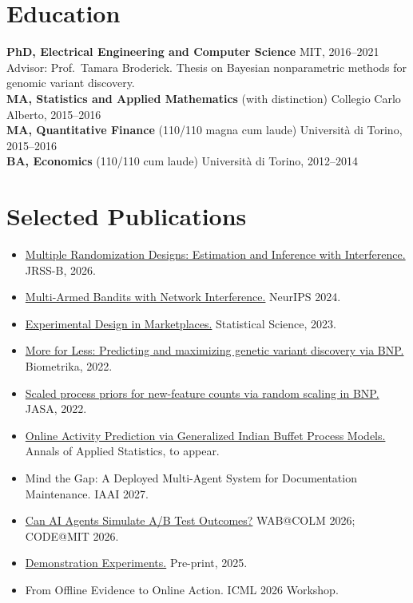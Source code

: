 \documentclass[10pt, a4paper]{article}
\begin{document}
\section{Education}

\textbf{PhD, Electrical Engineering and Computer Science} \hfill MIT, 2016--2021\\
Advisor: Prof.\ Tamara Broderick. Thesis on Bayesian nonparametric methods for genomic variant discovery.\\[2pt]
\textbf{MA, Statistics and Applied Mathematics} (with distinction) \hfill Collegio Carlo Alberto, 2015--2016\\[2pt]
\textbf{MA, Quantitative Finance} (110/110 magna cum laude) \hfill Universit\`{a} di Torino, 2015--2016\\[2pt]
\textbf{BA, Economics} (110/110 cum laude) \hfill Universit\`{a} di Torino, 2012--2014

\section{Selected Publications}

\begin{itemize}[leftmargin=*, nosep, itemsep=1pt]
\item \href{https://doi.org/10.1093/jrsssb/qkaf073}{Multiple Randomization Designs: Estimation and Inference with Interference.} JRSS-B, 2026.
\item \href{https://arxiv.org/abs/2405.18621}{Multi-Armed Bandits with Network Interference.} NeurIPS 2024.
\item \href{https://projecteuclid.org/journals/statistical-science/advance-publication/Experimental-Design-in-Marketplaces/10.1214/23-STS883.short}{Experimental Design in Marketplaces.} Statistical Science, 2023.
\item \href{https://academic.oup.com/biomet/advance-article-abstract/doi/10.1093/biomet/asab012/6146908}{More for Less: Predicting and maximizing genetic variant discovery via BNP.} Biometrika, 2022.
\item \href{https://www.tandfonline.com/doi/full/10.1080/01621459.2022.2115918}{Scaled process priors for new-feature counts via random scaling in BNP.} JASA, 2022.
\item \href{https://arxiv.org/abs/2505.19643}{Online Activity Prediction via Generalized Indian Buffet Process Models.} Annals of Applied Statistics, to appear.
\item Mind the Gap: A Deployed Multi-Agent System for Documentation Maintenance. IAAI 2027.
\item \href{https://arxiv.org/abs/2608.02345}{Can AI Agents Simulate A/B Test Outcomes?} WAB@COLM 2026; CODE@MIT 2026.
\item \href{https://arxiv.org/abs/2603.06941}{Demonstration Experiments.} Pre-print, 2025.
\item From Offline Evidence to Online Action. ICML 2026 Workshop.
\end{itemize}
\end{document}
